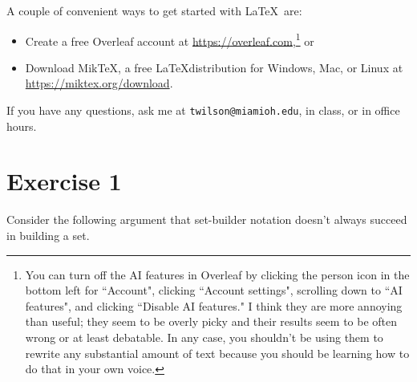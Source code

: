 \documentclass{article}
\begin{document}
A couple of convenient ways to get started with \LaTeX\ are:
\begin{itemize}
\item Create a free Overleaf account at \url{https://overleaf.com},\footnote{You can turn off the AI features in Overleaf by clicking the person icon in the bottom left for ``Account", clicking ``Account settings", scrolling down to ``AI features", and clicking ``Disable AI features."  I think they are more annoying than useful; they seem to be overly picky and their results seem to be often wrong or at least debatable.  In any case, you shouldn't be using them to rewrite any substantial amount of text because you should be learning how to do that in your own voice.} or

\item Download MikTeX, a free \LaTeX distribution for Windows, Mac, or Linux at \url{https://miktex.org/download}.
\end{itemize}




If you have any questions, ask me at \texttt{twilson@miamioh.edu}, in class, or in office hours.

\newpage

\section*{Exercise 1}

Consider the following argument that set-builder notation doesn't always succeed in building a set.
\end{document}
